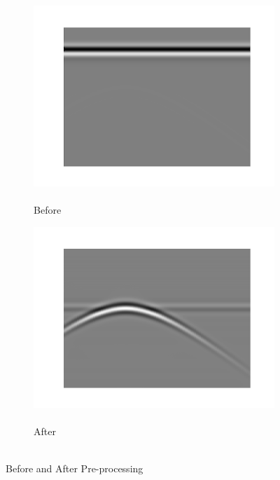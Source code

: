 \begin{figure}[H]
    \centering
    \begin{subfigure}[b]{0.45\linewidth}
        \includegraphics[width=\linewidth]{figures/before_preprocessing.png}
        \caption{\\Before}
    \end{subfigure}
    \begin{subfigure}[b]{0.45\linewidth}
        \includegraphics[width=\linewidth]{figures/after_preprocessing.png}
        \caption{\\After}
    \end{subfigure}
    \caption{\\Before and After Pre-processing}
    \label{fig:preprocessing}
\end{figure}

